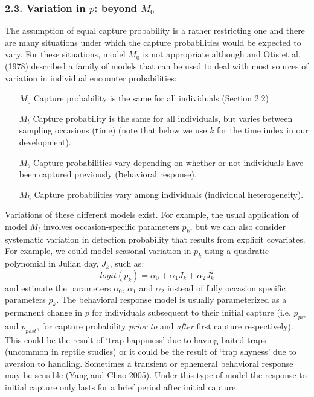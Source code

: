 \documentclass{book}
\begin{document}
\subsubsection*{2.3. Variation in $p$: beyond $M_0$}

The assumption of equal capture probability is a rather restricting
one and there are many situations under which the capture
probabilities would be expected to vary. For these situations, model
$M_0$ is not appropriate although and Otis et al. (1978) described a
family of models that can be used to deal with most sources of
variation in individual encounter probabilities:
\begin{itemize}
\item[$M_0$] Capture probability is the same for all individuals (Section 2.2)
\item[$M_t$] Capture probability is the same for all individuals, but
  varies between sampling occasions (\textbf{t}ime) (note that below we use
  $k$ for the time index in our development).
\item[$M_b$] Capture probabilities vary depending on whether or not
  individuals have been captured previously (\textbf{b}ehavioral
  response).
\item[$M_h$] Capture probabilities vary among individuals (individual
  \textbf{h}eterogeneity).
\end{itemize}

Variations of these different models exist. For example, the usual
application of model $M_t$ involves occasion-specific parameters
$p_{k}$, but we can also consider systematic variation in detection
probability that results from explicit covariates. For example, we
could model seasonal variation in $p_k$ using a quadratic polynomial
in Julian day, $J_{k}$, such as:
\[
 logit(p_{k}) = \alpha_0 + \alpha_1 J_{k} + \alpha_2 J^{2}_{k}
\]
and estimate the parameters $\alpha_0$, $\alpha_1$ and $\alpha_2$
instead of fully occasion specific parameters $p_k$.  The behavioral
response model is usually parameterized as a permanent change in $p$
for individuals subsequent to their initial capture (i.e. $p_{pre}$
and $p_{post}$, for capture probability {\it prior to} and {\it after}
first capture respectively). This could be the result of `trap
happiness' due to having baited traps (uncommon in reptile studies) or
it could be the result of `trap shyness' due to aversion to
handling. Sometimes a transient or ephemeral behavioral response may
be sensible (Yang and Chao 2005). Under this type of model the
response to initial capture only lasts for a brief period after
initial capture.
\end{document}
